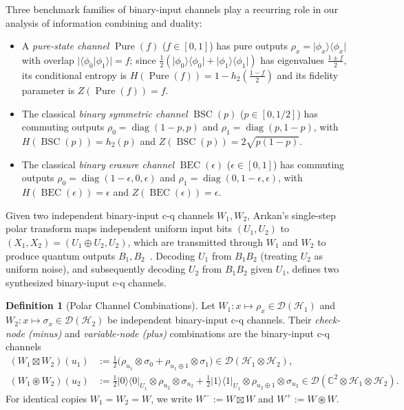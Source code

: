 \documentclass[10pt,a4paper]{article}
\numberwithin{equation}{section}
\theoremstyle{plain}
\theoremstyle{definition}
\newtheorem{definition}[theorem]{Definition}
\theoremstyle{remark}
\DeclareMathOperator{\diag}{diag}
\DeclareMathOperator{\BSC}{BSC}
\DeclareMathOperator{\BEC}{BEC}
\DeclareMathOperator{\Pure}{Pure}
\newcommand{\cH}{\mathcal{H}}
\newcommand{\cD}{\mathcal{D}}
\newcommand{\bC}{\mathbb{C}}
\newcommand{\ketbra}[1]{\lvert #1 \rangle\langle #1 \rvert}
\newcommand{\braket}[2]{\langle #1 \vert #2 \rangle}
\begin{document}
Three benchmark families of binary-input channels play a recurring role in our analysis of information combining and duality:
\begin{itemize}
\item A \emph{pure-state channel} $\Pure(f)$ ($f \in [0,1]$) has pure outputs $\rho_x = \ketbra{\phi_x}$ with overlap $\lvert \braket{\phi_0}{\phi_1} \rvert = f$; since $\frac{1}{2}(\ketbra{\phi_0} + \ketbra{\phi_1})$ has eigenvalues $\frac{1 \pm f}{2}$, its conditional entropy is $H(\Pure(f)) = 1 - h_2\!\left(\frac{1-f}{2}\right)$ and its fidelity parameter is $Z(\Pure(f)) = f$.
\item The classical \emph{binary symmetric channel} $\BSC(p)$ ($p \in [0, 1/2]$) has commuting outputs $\rho_0 = \diag(1-p, p)$ and $\rho_1 = \diag(p, 1-p)$, with $H(\BSC(p)) = h_2(p)$ and $Z(\BSC(p)) = 2\sqrt{p(1-p)}$.
\item The classical \emph{binary erasure channel} $\BEC(\epsilon)$ ($\epsilon \in [0,1]$) has commuting outputs $\rho_0 = \diag(1-\epsilon, 0, \epsilon)$ and $\rho_1 = \diag(0, 1-\epsilon, \epsilon)$, with $H(\BEC(\epsilon)) = \epsilon$ and $Z(\BEC(\epsilon)) = \epsilon$.
\end{itemize}

Given two independent binary-input c-q channels $W_1, W_2$, Ar{\i}kan's single-step polar transform maps independent uniform input bits $(U_1, U_2)$ to $(X_1, X_2) = (U_1 \oplus U_2, U_2)$, which are transmitted through $W_1$ and $W_2$ to produce quantum outputs $B_1, B_2$~\cite{Arikan2009,WildeGuha2013}. Decoding $U_1$ from $B_1 B_2$ (treating $U_2$ as uniform noise), and subsequently decoding $U_2$ from $B_1 B_2$ given $U_1$, defines two synthesized binary-input c-q channels.

\begin{definition}[Polar Channel Combinations]\label{def:polar-combinations}
Let $W_1 : x \mapsto \rho_x \in \cD(\cH_1)$ and $W_2 : x \mapsto \sigma_x \in \cD(\cH_2)$ be independent binary-input c-q channels. Their \emph{check-node (minus)} and \emph{variable-node (plus)} combinations are the binary-input c-q channels
\begin{align}
(W_1 \boxtimes W_2)(u_1) &:= \frac{1}{2}\bigl(\rho_{u_1} \otimes \sigma_0 + \rho_{u_1 \oplus 1} \otimes \sigma_1\bigr) \in \cD(\cH_1 \otimes \cH_2), \label{eq:check-node}\\
(W_1 \circledast W_2)(u_2) &:= \frac{1}{2}\ketbra{0}_{U_1} \otimes \rho_{u_2} \otimes \sigma_{u_2} + \frac{1}{2}\ketbra{1}_{U_1} \otimes \rho_{u_2 \oplus 1} \otimes \sigma_{u_2} \in \cD(\bC^2 \otimes \cH_1 \otimes \cH_2). \label{eq:var-node}
\end{align}
For identical copies $W_1 = W_2 = W$, we write $W^- := W \boxtimes W$ and $W^+ := W \circledast W$.
\end{definition}
\end{document}
